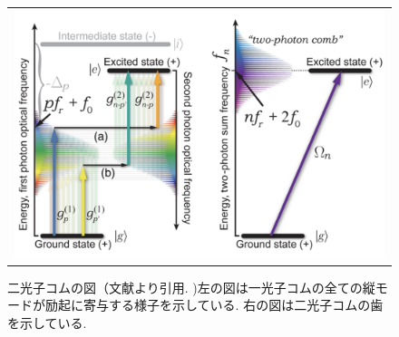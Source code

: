 \documentclass[uplatex, dvipdfmx, a4paper, report, papersize, 11pt]{jsbook}
\begin{document}
\begin{figure}[H]
  \centering
    \begin{tabular}{c}
      \begin{minipage}{1\hsize}
        \centering
          \includegraphics[keepaspectratio,  scale=0.2,  angle=0]
                          {figures/chapter3/two-photon-comb-figure.png}
                          \caption{二光子コムの図（文献\cite{PhysRevX.6.041004}より引用. )左の図は一光子コムの全ての縦モードが励起に寄与する様子を示している. 右の図は二光子コムの歯を示している. }
                          \label{two-photon-comb-figure}

      \end{minipage}
    \end{tabular}
\end{figure}
\end{document}
